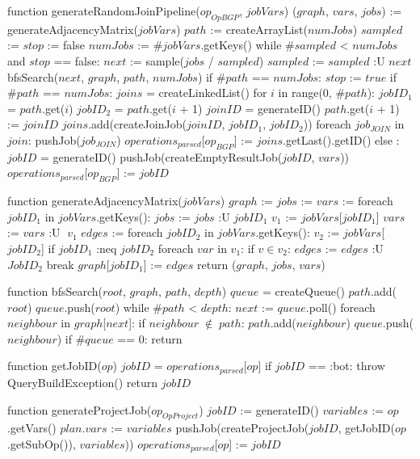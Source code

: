 function generateRandomJoinPipeline($op_{OpBGP}$, $jobVars$) 
    ($graph$, $vars$, $jobs$) := generateAdjacencyMatrix($jobVars$)
    $path$ := createArrayList($numJobs$)
    $sampled$ := {}
    $stop$ := false
    $numJobs$ := $\#jobVars$.getKeys()
    while $\#sampled$ < $numJobs$ and $stop$ == false:
        $next$ := sample($jobs$ / $sampled$)
        $sampled$ := $sampled$ :U { $next$ }
        bfsSearch($next$, $graph$, $path$, $numJobs$)
        if $\#path$ == $numJobs$:
            $stop$ := $true$
    if $\#path$ == $numJobs$: 
        $joins$ = createLinkedList()
        for $i$ in range(0, $\#path$):
            $jobID_1$ = $path$.get($i$)
            $jobID_2$ = $path$.get($i$ + 1)
            $joinID$ = generateID()
            $path$.get($i$ + 1) := $joinID$
            $joins$.add(createJoinJob($joinID$, $jobID_1$, $jobID_2$))
        foreach $job_{JOIN}$ in $join$:
            pushJob($job_{JOIN}$)
        $operations_{parsed}$[$op_{BGP}$] := $joins$.getLast().getID()
    else :
        $jobID$ = generateID()
        pushJob(createEmptyResultJob($jobID$, $vars$))
        $operations_{parsed}$[$op_{BGP}$] := $jobID$
    
function generateAdjacencyMatrix($jobVars$) 
    $graph$ := {}
    $jobs$ := {}
    $vars$ := {}
    foreach $jobID_1$ in $jobVars$.getKeys(): 
        $jobs$ := $jobs$ :U { $jobID_1$ }
        $v_1$ := $jobVars$[$jobID_1$]
        $vars$ := $vars$ :U $\;v_1$
        $edges$ := {}
        foreach $jobID_2$ in $jobVars$.getKeys():
            $v_2$ := $jobVars$[$jobID_2$]
            if $jobID_1$ :neq $jobID_2$
                foreach $var$ \; in \; $v_1$:
                    if $v \in v_2$:
                        $edges$ := $edges$ :U { $JobID_2$ }
                        break
        $graph$[$jobID_1$] := $edges$
    return ($graph$, $jobs$, $vars$)


function bfsSearch($root$, $graph$, $path$, $depth$) 
    $queue$ = createQueue()
    $path$.add($root$)
    $queue$.push($root$)
    while $\#path$ < $depth$: 
        $next$ := $queue$.poll()
        foreach $neighbour$ in $graph$[$next$]:
            if $neighbour \; \notin \; path$:
                $path$.add($neighbour$)
                $queue$.push($neighbour$)
        if $\#queue$ == 0:
            return  

function getJobID($op$) 
    $jobID$ = $operations_{parsed}$[$op$]
    if $jobID$ == :bot:
        throw QueryBuildException()
    return $jobID$

function generateProjectJob($op_{OpProject}$) 
    $jobID$ := generateID()
    $variables$ := $op$.getVars()
    $plan$.$vars$ := $variables$
    pushJob(createProjectJob($jobID$, getJobID($op$.getSubOp()), $variables$))
    $operations_{parsed}$[$op$] := $jobID$

